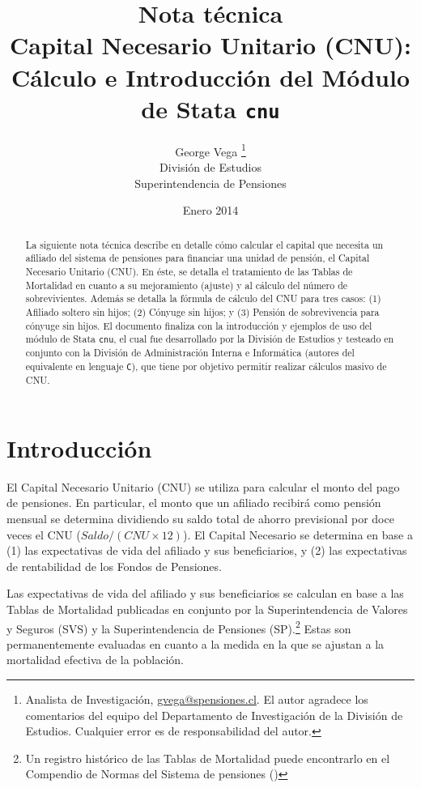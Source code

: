 \documentclass[letterpaper, 11pt]{article}
\title{Nota t\'ecnica \\[2cm] Capital Necesario Unitario (CNU):\\ C\'alculo e Introducci\'on
del M\'odulo de Stata {\tt cnu}}
\author{George Vega
\thanks{Analista de Investigaci\'on, \href{mailto:gvega@spensiones.cl}{gvega@spensiones.cl}.
El autor agradece los comentarios del equipo del Departamento de Investigaci\'on
de la Divisi\'on de Estudios. Cualquier error es de responsabilidad del autor.}
\\Divisi\'on de Estudios\\Superintendencia de Pensiones}
\date{Enero 2014}
\begin{document}
\maketitle

\begin{abstract}
La siguiente nota t\'ecnica describe en detalle c\'omo calcular el capital que
necesita un afiliado del sistema de pensiones para financiar una unidad de 
pensi\'on, el Capital Necesario Unitario (CNU). En \'este, se detalla el tratamiento
de las Tablas de Mortalidad en cuanto a su mejoramiento (ajuste) y al c\'alculo
del n\'umero de sobrevivientes. Adem\'as se detalla la f\'ormula de c\'alculo del
CNU para tres casos: (1) Afiliado soltero sin hijos; (2) C\'onyuge sin hijos; y (3)
Pensi\'on de sobrevivencia para c\'onyuge sin hijos. El documento finaliza con
la introducci\'on y ejemplos de uso del m\'odulo de Stata {\tt cnu}, el cual fue
desarrollado por la Divisi\'on de Estudios y testeado en conjunto con la Divisi\'on
de Administraci\'on Interna e Inform\'atica (autores del equivalente en lenguaje
{\tt C}), que tiene por objetivo permitir realizar c\'alculos masivo de CNU.
\end{abstract}

\clearpage

\tableofcontents

\section{Introducci\'on}

El Capital Necesario Unitario (CNU) se utiliza para calcular el monto del pago de
pensiones. En particular, el monto que un afiliado recibir\'a como pensi\'on mensual
se determina dividiendo su saldo total de ahorro previsional por doce veces el CNU
($Saldo/(CNU\times 12)$). El Capital Necesario se determina en base a (1) las
expectativas de vida del afiliado y sus beneficiarios, y (2) las expectativas de
rentabilidad de los Fondos de Pensiones.

Las expectativas de vida del afiliado y sus beneficiarios se calculan en base a las 
Tablas de Mortalidad publicadas en conjunto por la Superintendencia de Valores y
Seguros (SVS) y la Superintendencia de Pensiones (SP).\footnote{Un registro 
hist\'orico de las Tablas de Mortalidad puede encontrarlo en el Compendio de Normas
del Sistema de pensiones ()} Estas son permanentemente evaluadas
en cuanto a la medida en la que se ajustan a la mortalidad efectiva de la poblaci\'on.
\end{document}
